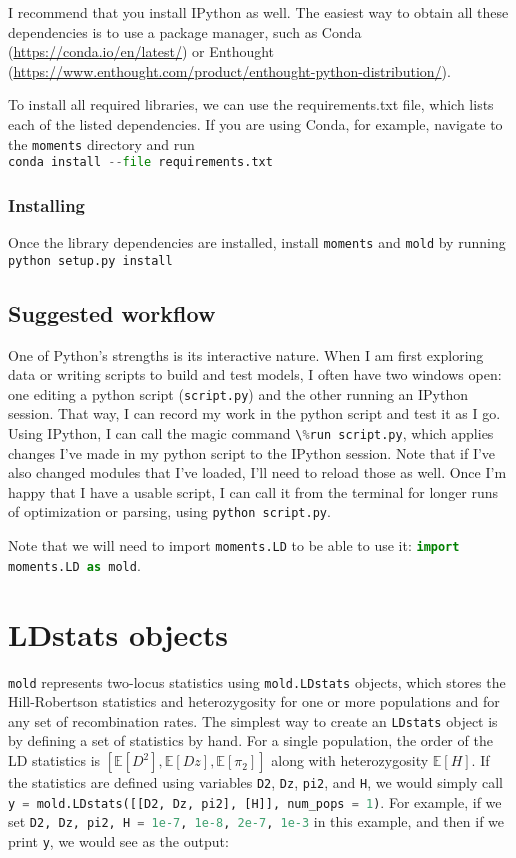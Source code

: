 \documentclass[10pt]{article}
\makeatletter
\newcommand{\mold}{\texttt{mold}\xspace}
\newcommand{\py}[1]{\lstinline[breaklines=true,language=Python, showstringspaces=False]@#1@}
\newcommand{\E}{\mathbb{E}}
\makeatother
\begin{document}
I recommend that you install IPython as well.
The easiest way to obtain all these dependencies is to use a package manager, such as Conda (\url{https://conda.io/en/latest/}) or Enthought (\url{https://www.enthought.com/product/enthought-python-distribution/}).

To install all required libraries, we can use the requirements.txt file, which lists each of the listed dependencies.
If you are using Conda, for example, navigate to the \py{moments} directory and run\\
\py{conda install --file requirements.txt}

\subsubsection{Installing}
Once the library dependencies are installed, install \py{moments} and \mold by running\\
\py{python setup.py install}\\

\subsection{Suggested workflow}

One of Python's strengths is its interactive nature.
When I am first exploring data or writing scripts to build and test models, I often have two windows open: one editing a python script (\py{script.py}) and the other running an IPython session.
That way, I can record my work in the python script and test it as I go.
Using IPython, I can call the magic command \py{\%run script.py}, which applies changes I've made in my python script to the IPython session.
Note that if I've also changed modules that I've loaded, I'll need to reload those as well.
Once I'm happy that I have a usable script, I can call it from the terminal for longer runs of optimization or parsing, using \py{python script.py}.

Note that we will need to import \py{moments.LD} to be able to use it: \py{import moments.LD as mold}.

\section{LDstats objects}

\mold represents two-locus statistics using \py{mold.LDstats} objects, which stores the Hill-Robertson statistics and heterozygosity for one or more populations and for any set of recombination rates.
The simplest way to create an \py{LDstats} object is by defining a set of statistics by hand.
For a single population, the order of the LD statistics is $[\E[D^2], \E[Dz], \E[\pi_2]]$ along with heterozygosity $\E[H]$.
If the statistics are defined using variables \py{D2}, \py{Dz}, \py{pi2}, and \py{H}, we would simply call \py{y = mold.LDstats([[D2, Dz, pi2], [H]], num_pops = 1)}.
For example, if we set \py{D2, Dz, pi2, H = 1e-7, 1e-8, 2e-7, 1e-3} in this example, and then if we print \py{y}, we would see as the output:
\end{document}
